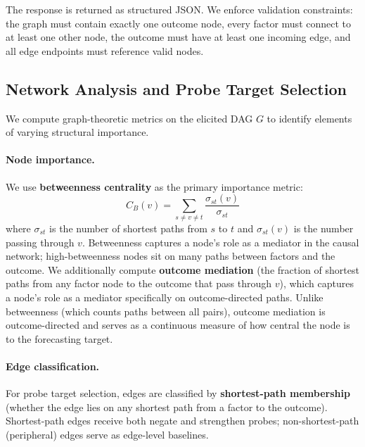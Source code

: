 \documentclass[11pt]{article}
\begin{document}
The response is returned as structured JSON. We enforce validation constraints: the graph must contain exactly one outcome node, every factor must connect to at least one other node, the outcome must have at least one incoming edge, and all edge endpoints must reference valid nodes.

\subsection{Network Analysis and Probe Target Selection}
\label{sec:network}

We compute graph-theoretic metrics on the elicited DAG $G$ to identify elements of varying structural importance.

\paragraph{Node importance.} We use \textbf{betweenness centrality} as the primary importance metric:
\begin{equation}
    C_B(v) = \sum_{s \neq v \neq t} \frac{\sigma_{st}(v)}{\sigma_{st}}
\end{equation}
where $\sigma_{st}$ is the number of shortest paths from $s$ to $t$ and $\sigma_{st}(v)$ is the number passing through $v$. Betweenness captures a node's role as a mediator in the causal network; high-betweenness nodes sit on many paths between factors and the outcome. We additionally compute \textbf{outcome mediation} (the fraction of shortest paths from any factor node to the outcome that pass through $v$), which captures a node's role as a mediator specifically on outcome-directed paths. Unlike betweenness (which counts paths between all pairs), outcome mediation is outcome-directed and serves as a continuous measure of how central the node is to the forecasting target.

\paragraph{Edge classification.} For probe target selection, edges are classified by \textbf{shortest-path membership} (whether the edge lies on any shortest path from a factor to the outcome). Shortest-path edges receive both negate and strengthen probes; non-shortest-path (peripheral) edges serve as edge-level baselines.
\end{document}
